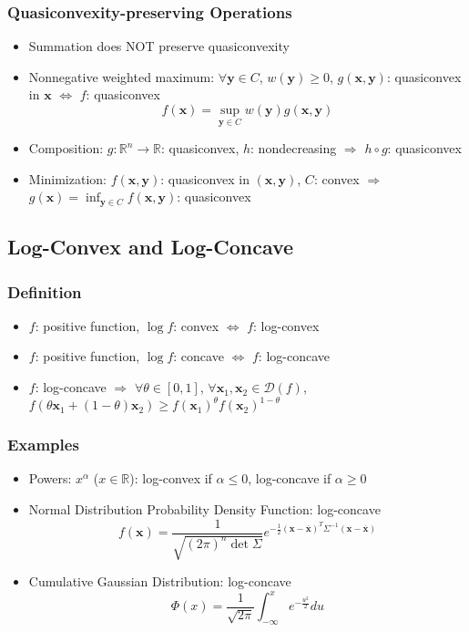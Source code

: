 \subsubsection*{Quasiconvexity-preserving Operations}
\begin{itemize}
    \item Summation does NOT preserve quasiconvexity
    \item Nonnegative weighted maximum: $\forall \mathbf{y} \in C$, $w(\mathbf{y}) \geq 0$,
        $g(\mathbf{x}, \mathbf{y})$: quasiconvex in $\mathbf{x}$ $\Leftrightarrow$ $f$: quasiconvex
        $$ f(\mathbf{x}) = \sup_{\mathbf{y} \in C} w(\mathbf{y})g(\mathbf{x}, \mathbf{y}) $$
    \item Composition: $g: \mathbb{R}^n \rightarrow \mathbb{R}$: quasiconvex, $h$: nondecreasing $\Rightarrow$ $h \circ g$: quasiconvex
    \item Minimization: $f(\mathbf{x}, \mathbf{y})$: quasiconvex in  $(\mathbf{x},\mathbf{y})$, $C$: convex
        $\Rightarrow$ $g(\mathbf{x}) = \inf_{\mathbf{y} \in C} f(\mathbf{x}, \mathbf{y})$: quasiconvex
\end{itemize}

\subsection{Log-Convex and Log-Concave}

\subsubsection*{Definition}
\begin{itemize}
    \item $f$: positive function, $\log f$: convex $\Leftrightarrow$ $f$: log-convex
    \item $f$: positive function, $\log f$: concave $\Leftrightarrow$ $f$: log-concave
    \item $f$: log-concave $\Rightarrow$ $\forall \theta \in [0,1]$, $\forall \mathbf{x}_1,\mathbf{x}_2 \in \mathcal{D}(f)$,
        $f(\theta \mathbf{x}_1 + (1 - \theta) \mathbf{x}_2) \geq f(\mathbf{x}_1)^{\theta} f(\mathbf{x}_2)^{1-\theta}$
\end{itemize}

\subsubsection*{Examples}
\begin{itemize}
    \item Powers: $x^{\alpha}$ ($x \in \mathbb{R}$): log-convex if $\alpha \leq 0$, log-concave if $\alpha \geq 0$
    \item Normal Distribution Probability Density Function: log-concave
        $$ f(\mathbf{x}) = \frac 1 {\sqrt{(2\pi)^n \det\Sigma}} e^{-\frac 1 2 \left(\mathbf{x} - \mathbf{\overline{x}}\right)^T \Sigma^{-1} \left(\mathbf{x} - \mathbf{\overline{x}}\right)} $$
    \item Cumulative Gaussian Distribution: log-concave
        $$ \Phi(x) = \frac 1 {\sqrt{2\pi}} \int_{-\infty}^x e^{-\frac {u^2} 2} du $$
\end{itemize}

